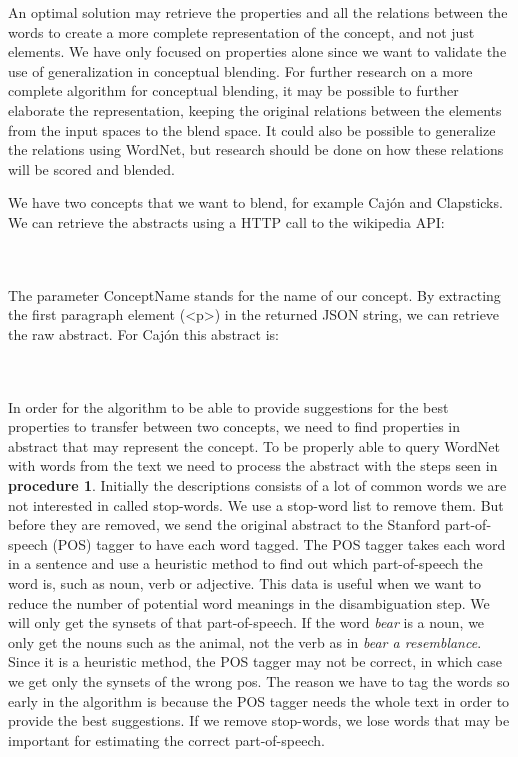 An optimal solution may retrieve the properties and all the relations between the words to create a more complete representation of the concept, and not just elements. We have only focused on properties alone since we want to validate the use of generalization in conceptual blending. For further research on a more complete algorithm for conceptual blending, it may be possible to further elaborate the representation, keeping the original relations between the elements from the input spaces to the blend space. It could also be possible to generalize the relations using WordNet, but research should be done on how these relations will be scored and blended.

We have two concepts that we want to blend, for example Cajón and Clapsticks.
We can retrieve the abstracts using a HTTP call to the wikipedia API:

\noindent{}
\\\\The parameter ConceptName stands for the name of our concept. By extracting the first paragraph element (<p>) in the returned JSON string, we can retrieve the raw abstract. For Cajón this abstract is:
 
\noindent{}
\\\\In order for the algorithm to be able to provide suggestions for the best properties to transfer between two concepts, we need to find properties in abstract that may represent the concept. To be properly able to query WordNet with words from the text we need to process the abstract with the steps seen in \textbf{procedure 1}. Initially the descriptions consists of a lot of common words we are not interested in called stop-words. We use a stop-word list to remove them. But before they are removed, we send the original abstract to the Stanford part-of-speech (POS) tagger to have each word tagged. The POS tagger takes each word in a sentence and use a heuristic method to find out which part-of-speech the word is, such as noun, verb or adjective. This data is useful when we want to reduce the number of potential word meanings in the disambiguation step. We will only get the synsets of that part-of-speech. If the word \emph{bear} is a noun, we only get the nouns such as the animal, not the verb as in \emph{bear a resemblance}. Since it is a heuristic method, the POS tagger may not be correct, in which case we get only the synsets of the wrong pos. The reason we have to tag the words so early in the algorithm is because the POS tagger needs the whole text in order to provide the best suggestions. If we remove stop-words, we lose words that may be important for estimating the correct part-of-speech. 

